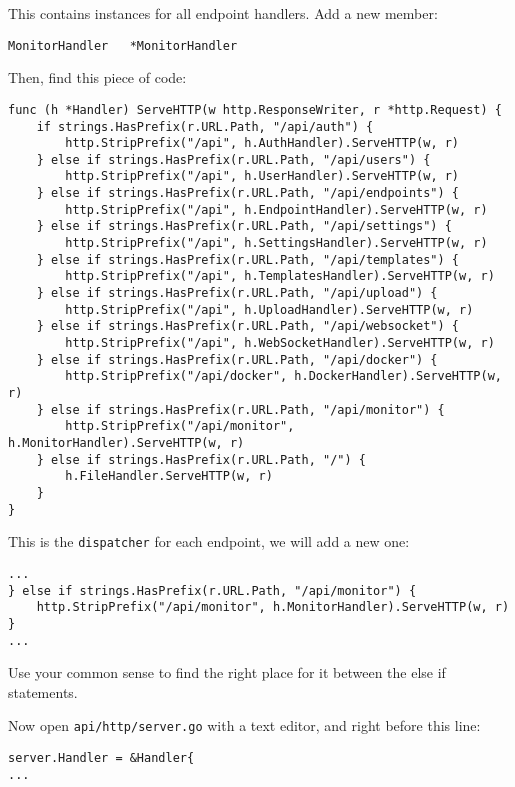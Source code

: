 This contains instances for all endpoint handlers. Add a new member:

\begin{lstlisting}[language=Golang]
MonitorHandler   *MonitorHandler
\end{lstlisting}

Then, find this piece of code:

\begin{lstlisting}[language=Golang]
func (h *Handler) ServeHTTP(w http.ResponseWriter, r *http.Request) {
    if strings.HasPrefix(r.URL.Path, "/api/auth") {
        http.StripPrefix("/api", h.AuthHandler).ServeHTTP(w, r)
    } else if strings.HasPrefix(r.URL.Path, "/api/users") {
        http.StripPrefix("/api", h.UserHandler).ServeHTTP(w, r)
    } else if strings.HasPrefix(r.URL.Path, "/api/endpoints") {
        http.StripPrefix("/api", h.EndpointHandler).ServeHTTP(w, r)
    } else if strings.HasPrefix(r.URL.Path, "/api/settings") {
        http.StripPrefix("/api", h.SettingsHandler).ServeHTTP(w, r)
    } else if strings.HasPrefix(r.URL.Path, "/api/templates") {
        http.StripPrefix("/api", h.TemplatesHandler).ServeHTTP(w, r)
    } else if strings.HasPrefix(r.URL.Path, "/api/upload") {
        http.StripPrefix("/api", h.UploadHandler).ServeHTTP(w, r)
    } else if strings.HasPrefix(r.URL.Path, "/api/websocket") {
        http.StripPrefix("/api", h.WebSocketHandler).ServeHTTP(w, r)
    } else if strings.HasPrefix(r.URL.Path, "/api/docker") {
        http.StripPrefix("/api/docker", h.DockerHandler).ServeHTTP(w, r)
    } else if strings.HasPrefix(r.URL.Path, "/api/monitor") {
        http.StripPrefix("/api/monitor", h.MonitorHandler).ServeHTTP(w, r)
    } else if strings.HasPrefix(r.URL.Path, "/") {
        h.FileHandler.ServeHTTP(w, r)
    }
}
\end{lstlisting}

This is the \texttt{dispatcher} for each endpoint, we will add a new one:

\begin{lstlisting}
...
} else if strings.HasPrefix(r.URL.Path, "/api/monitor") {
    http.StripPrefix("/api/monitor", h.MonitorHandler).ServeHTTP(w, r)
}
...
\end{lstlisting}

Use your common sense to find the right place for it between the else if statements.

Now open \texttt{api/http/server.go} with a text editor, and right before this line:

\begin{lstlisting}[language=Golang]
server.Handler = &Handler{
...
\end{lstlisting}

